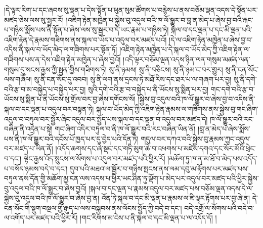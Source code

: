 །དེ་ལྟར་རིག་པ་དང་ཞབས་སུ་ལྡན་པ་དེས་སྟོན་པ་ཕུན་སུམ་ཚོགས་པ་བརྙེས་པ་ནས་བཅོམ་ལྡན་འདས་དེ་སྟོན་པར་མཛད་ཅེས་ལས་སུ་སྦྱར་རོ། །འཇིག་རྟེན་མཁྱེན་པ་སྐྱེས་བུ་འདུལ་བའི་ཁ་ལོ་སྒྱུར་བ་བླ་ན་མེད་པ་ཞེས་བྱ་བའི་རྐང་པ་གཉིས་སྨོས་པས་ནི་སྟོན་པ་ཞེས་ལས་སུ་སྦྱར་བ་དེ་ཡང་རྣམ་པ་གཉིས་ཏེ། སྐལ་བ་དང་ལྡན་པ་དང་མི་ལྡན་པའི་འཇིག་རྟེན་དེ་རྣམས་གཟིགས་ནས་སྐལ་བ་ཡོད་པ་འདུལ་བར་མཛད་པའོ། །དེ་ལ་འཇིག་རྟེན་མཁྱེན་པ་ཞེས་བྱ་བ་འདིས་ནི་སྐལ་བ་ཡོད་མེད་ལ་གཟིགས་པར་སྟོན་ཏོ། །འཇིག་རྟེན་མཁྱེན་པ་དེ་སྐལ་བ་ཡོད་མེད་ཀྱི་འཇིག་རྟེན་ལ་གཟིགས་པས་ན་དེས་འཇིག་རྟེན་མཁྱེན་པ་ཞེས་བྱའོ། །འདི་ལྟར་བཅོམ་ལྡན་འདས་ཉིན་ལན་གསུམ་མཚན་ལན་གསུམ་དུ་སངས་རྒྱས་ཀྱི་སྤྱན་གྱིས་གཟིགས་ཏེ། སུ་ནི་ཉམས། སུ་ནི་བཅིངས། སུ་ནི་ཉམ་ང་བར་གྱུར། སུ་ནི་ངན་སོང་ལས་གཞོལ། སུ་ནི་ངན་སོང་དུ་འབབ། སུ་ནི་ལག་ནས་དྲངས་ཏེ་མཐོ་རིས་དང་ཐར་པ་ལ་གཞག་པར་བྱ། སུ་ནི་དགེ་བའི་རྩ་བ་མ་བསྐྱེད་པ་བསྐྱེད་པར་བྱ། སུའི་དགེ་བའི་རྩ་བ་བསྐྱེད་པ་ནི་ཡོངས་སུ་སྨིན་པར་བྱ། གང་དགེ་བའི་རྩ་བ་ཡོངས་སུ་སྨིན་པ་ནི་ཡོངས་སུ་གྲོལ་བར་བྱ་ཞེས་དགོངས་སོ། །སྐྱེས་བུ་འདུལ་བའི་ཁ་ལོ་སྒྱུར་བ་ཞེས་བྱ་བ་འདིས་ནི་སྐལ་བ་དང་ལྡན་པ་འདུལ་བར་བསྟན་ཏེ། སྐལ་བ་ཡོད་མེད་ཀྱི་འཇིག་རྟེན་རྣམས་ལ་གཟིགས་ནས་སྐྱེས་བུ་གང་ཞིག་འདུལ་བ་བཏུལ་བར་སྦྱོར་ཞིང་འདུལ་བར་སྤྱོད་པས་སྐལ་བ་དང་ལྡན་བ་འདུལ་བར་མཛད་དེ། ཁ་ལོ་སྒྱུར་བའི་རང་བཞིན་ནི་འདྲེན་པ་སྟེ། གང་ཞིག་འདིར་བཏུལ་བ་ནི་ཁ་ལོ་སྒྱུར་བའི་རང་བཞིན་ཡིན་ནོ། །བླ་ན་མེད་པ་ཞེས་སྨོས་པས་ནི་ཁ་ལོ་སྒྱུར་བའི་དངོས་པོ་ཁྱད་པར་དུ་བྱེད་པའི་དོན་ཏེ། གདུལ་བར་དཀའ་བའི་སྐྱེས་བུ་རྣམས་ཀྱང་འདུལ་བར་མཛད་པ་ཡིན་ནོ། །འདོད་ཆགས་དང་ཞེ་སྡང་དང་གཏི་མུག་ཆེ་བ་འཕགས་པ་མཛེས་དགའ་དང་སོར་མོའི་ཕྲེང་བ་དང་། ལྟེང་རྒྱས་འོད་སྲུངས་ལ་སོགས་པ་འདུལ་བར་མཛད་པའི་ཕྱིར་རོ། །མཆོག་ཏུ་ཁ་ན་མ་ཐོ་བ་མེད་པས་འདོད་པ་བསོད་ཉམས་བདེ་བ་དང་། དུབ་པའི་མཐའ་ལ་སྦྱོར་བ་གཉིས་སྤངས་ནས་ལམ་དབུ་མ་རྟོགས་པར་མཛད་པས་བཏུལ་ནས་དོན་གྱི་མཆོག་མྱ་ངན་ལས་འདས་པ་ཕྱིར་ཡང་ཤིན་ཏུ་ལྡོག་པ་མེད་པར་འདུལ་བར་མཛད་པའི་ཕྱིར་སྐྱེས་བུ་འདུལ་བའི་ཁ་ལོ་སྒྱུར་བ་ཞེས་བྱའོ། །སྐལ་བ་དང་ལྡན་པ་རྣམས་འདུལ་བར་མཛད་པས་བཅོམ་ལྡན་འདས་དེ་ལ་སྐྱེས་བུ་འདུལ་བའི་ཁ་ལོ་སྒྱུར་བ་ཞེས་བྱ་ན། འོན་ཏེ་སྐལ་བ་དང་མི་ལྡན་པ་རྣམས་ལ་ཇི་ལྟར་རྟོགས་པར་བྱ་ཞེ་ན། དེ་ངན་སོང་གི་སྡུག་བསྔལ་གྱི་རྒུད་པ་ལས་བསྐྱབས་ནས་ལོངས་སྤྱོད་ཀྱི་བདེ་བ་དང་། བདེ་འགྲོ་ལ་སོགས་པའི་བདེ་བ་ལ་འགོད་པར་མཛད་པའི་ཕྱིར་རོ། །གང་རིགས་མ་ངེས་པ་ནི་སྐལ་བ་དང་མི་ལྡན་པ་ལ་འདོད་དོ། །
